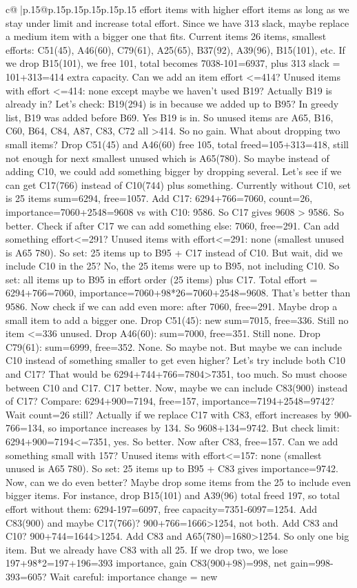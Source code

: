 \documentclass{article}
\begin{document}
{\begin{supertabular}{c@{$\;$}|p{.15\linewidth}@{}p{.15\linewidth}p{.15\linewidth}p{.15\linewidth}p{.15\linewidth}p{.15\linewidth}}
{{{effort items with higher effort items as long as we stay under limit and increase total effort. Since we have 313 slack, maybe replace a medium item with a bigger one that fits. Current items 26 items, smallest efforts: C51(45), A46(60), C79(61), A25(65), B37(92), A39(96), B15(101), etc. If we drop B15(101), we free 101, total becomes 7038{-}101=6937, plus 313 slack = 101+313=414 extra capacity. Can we add an item effort <=414? Unused items with effort <=414: none except maybe we haven’t used B19? Actually B19 is already in? Let’s check: B19(294) is in because we added up to B95? In greedy list, B19 was added before B69. Yes B19 is in. So unused items are A65, B16, C60, B64, C84, A87, C83, C72 all >414. So no gain. What about dropping two small items? Drop C51(45) and A46(60) free 105, total freed=105+313=418, still not enough for next smallest unused which is A65(780). So maybe instead of adding C10, we could add something bigger by dropping several. Let’s see if we can get C17(766) instead of C10(744) plus something. Currently without C10, set is 25 items sum=6294, free=1057. Add C17: 6294+766=7060, count=26, importance=7060+2548=9608 vs with C10: 9586. So C17 gives 9608 > 9586. So better. Check if after C17 we can add something else: 7060, free=291. Can add something effort<=291? Unused items with effort<=291: none (smallest unused is A65 780). So set: 25 items up to B95 + C17 instead of C10. But wait, did we include C10 in the 25? No, the 25 items were up to B95, not including C10. So set: all items up to B95 in effort order (25 items) plus C17. Total effort = 6294+766=7060, importance=7060+98*26=7060+2548=9608. That’s better than 9586. Now check if we can add even more: after 7060, free=291. Maybe drop a small item to add a bigger one. Drop C51(45): new sum=7015, free=336. Still no item <=336 unused. Drop A46(60): sum=7000, free=351. Still none. Drop C79(61): sum=6999, free=352. None. So maybe not. But maybe we can include C10 instead of something smaller to get even higher? Let’s try include both C10 and C17? That would be 6294+744+766=7804>7351, too much. So must choose between C10 and C17. C17 better. Now, maybe we can include C83(900) instead of C17? Compare: 6294+900=7194, free=157, importance=7194+2548=9742? Wait count=26 still? Actually if we replace C17 with C83, effort increases by 900{-}766=134, so importance increases by 134. So 9608+134=9742. But check limit: 6294+900=7194<=7351, yes. So better. Now after C83, free=157. Can we add something small with 157? Unused items with effort<=157: none (smallest unused is A65 780). So set: 25 items up to B95 + C83 gives importance=9742. Now, can we do even better? Maybe drop some items from the 25 to include even bigger items. For instance, drop B15(101) and A39(96) total freed 197, so total effort without them: 6294{-}197=6097, free capacity=7351{-}6097=1254. Add C83(900) and maybe C17(766)? 900+766=1666>1254, not both. Add C83 and C10? 900+744=1644>1254. Add C83 and A65(780)=1680>1254. So only one big item. But we already have C83 with all 25. If we drop two, we lose 197+98*2=197+196=393 importance, gain C83(900+98)=998, net gain=998{-}393=605? Wait careful: importance change = new }}}
\end{supertabular}}
\end{document}
